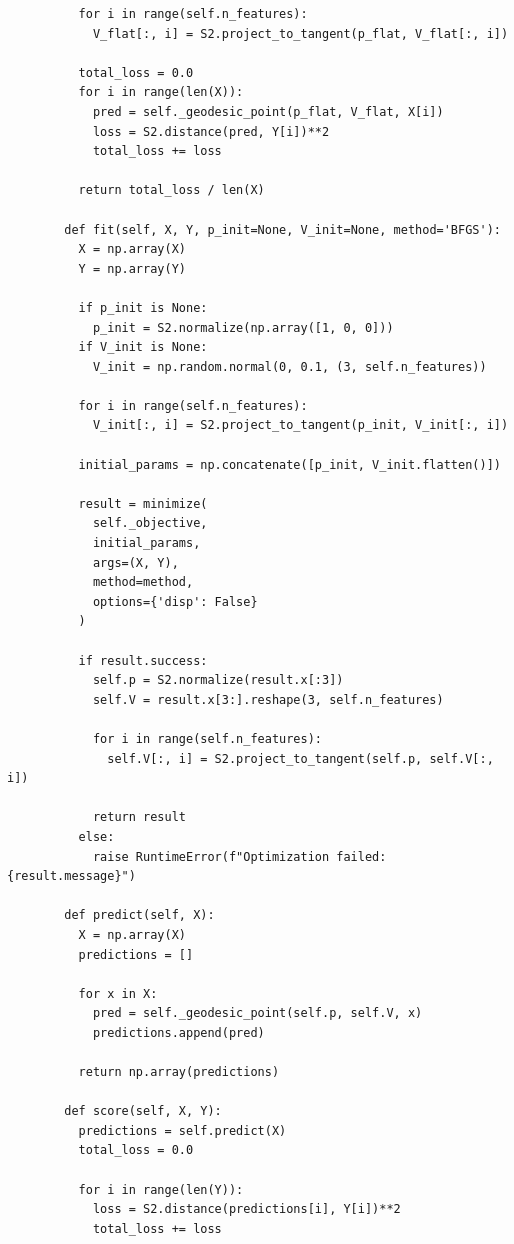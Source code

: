\begin{example}
\begin{lstlisting}
          for i in range(self.n_features):
            V_flat[:, i] = S2.project_to_tangent(p_flat, V_flat[:, i])
          
          total_loss = 0.0
          for i in range(len(X)):
            pred = self._geodesic_point(p_flat, V_flat, X[i])
            loss = S2.distance(pred, Y[i])**2
            total_loss += loss
          
          return total_loss / len(X)
        
        def fit(self, X, Y, p_init=None, V_init=None, method='BFGS'):
          X = np.array(X)
          Y = np.array(Y)
          
          if p_init is None:
            p_init = S2.normalize(np.array([1, 0, 0]))
          if V_init is None:
            V_init = np.random.normal(0, 0.1, (3, self.n_features))
          
          for i in range(self.n_features):
            V_init[:, i] = S2.project_to_tangent(p_init, V_init[:, i])
          
          initial_params = np.concatenate([p_init, V_init.flatten()])
          
          result = minimize(
            self._objective,
            initial_params,
            args=(X, Y),
            method=method,
            options={'disp': False}
          )
          
          if result.success:
            self.p = S2.normalize(result.x[:3])
            self.V = result.x[3:].reshape(3, self.n_features)
            
            for i in range(self.n_features):
              self.V[:, i] = S2.project_to_tangent(self.p, self.V[:, i])
            
            return result
          else:
            raise RuntimeError(f"Optimization failed: {result.message}")
        
        def predict(self, X):
          X = np.array(X)
          predictions = []
          
          for x in X:
            pred = self._geodesic_point(self.p, self.V, x)
            predictions.append(pred)
          
          return np.array(predictions)
        
        def score(self, X, Y):
          predictions = self.predict(X)
          total_loss = 0.0
          
          for i in range(len(Y)):
            loss = S2.distance(predictions[i], Y[i])**2
            total_loss += loss
          

\end{lstlisting}
\end{example}
